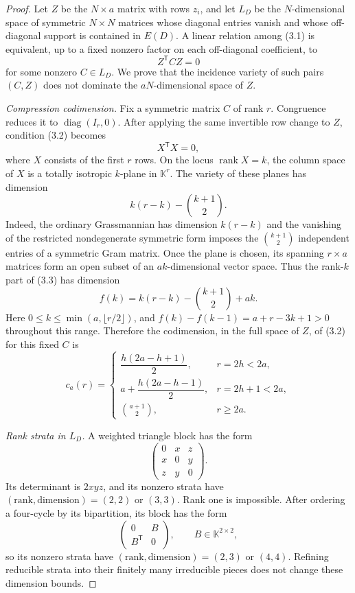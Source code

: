 \documentclass[11pt]{article}
\newcommand{\K}{\mathbb{K}}
\newcommand{\rank}{\operatorname{rank}}
\begin{document}
\begin{proof}
Let $Z$ be the $N\times a$ matrix with rows $z_i$, and let $L_D$ be the
$N$-dimensional space of symmetric $N\times N$ matrices whose diagonal
entries vanish and whose off-diagonal support is contained in $E(D)$.  A
linear relation among (3.1) is equivalent, up to a fixed nonzero factor on
each off-diagonal coefficient, to
\[
 Z^{\mathsf T}CZ=0
 \tag{3.2}
\]
for some nonzero $C\in L_D$.  We prove that the incidence variety of such
pairs $(C,Z)$ does not dominate the $aN$-dimensional space of $Z$.

\smallskip
\noindent\emph{Compression codimension.}
Fix a symmetric matrix $C$ of rank $r$.  Congruence reduces it to
$\operatorname{diag}(I_r,0)$.  After applying the same invertible row change
to $Z$, condition (3.2) becomes
\[
 X^{\mathsf T}X=0,
 \tag{3.3}
\]
where $X$ consists of the first $r$ rows.  On the locus $\rank X=k$, the
column space of $X$ is a totally isotropic $k$-plane in $\K^r$.  The variety
of these planes has dimension
\[
 k(r-k)-\binom{k+1}{2}.
\]
Indeed, the ordinary Grassmannian has dimension $k(r-k)$ and the vanishing
of the restricted nondegenerate symmetric form imposes the
$\binom{k+1}{2}$ independent entries of a symmetric Gram matrix.  Once the
plane is chosen, its spanning $r\times a$ matrices form an open subset of an
$ak$-dimensional vector space.  Thus the rank-$k$ part of (3.3) has dimension
\[
 f(k)=k(r-k)-\binom{k+1}{2}+ak.
\]
Here $0\leq k\leq\min(a,\lfloor r/2\rfloor)$, and
$f(k)-f(k-1)=a+r-3k+1>0$ throughout this range.  Therefore the codimension,
in the full space of $Z$, of (3.2) for this fixed $C$ is
\[
 c_a(r)=
 \begin{cases}
 \dfrac{h(2a-h+1)}2,&r=2h<2a,\\[5pt]
 a+\dfrac{h(2a-h-1)}2,&r=2h+1<2a,\\[5pt]
 \binom{a+1}{2},&r\geq2a.
 \end{cases}
 \tag{3.4}
\]

\smallskip
\noindent\emph{Rank strata in $L_D$.}
A weighted triangle block has the form
\[
 \begin{pmatrix}
 0&x&z\\ x&0&y\\ z&y&0
 \end{pmatrix}.
\]
Its determinant is $2xyz$, and its nonzero strata have
$(\text{rank},\text{dimension})=(2,2)$ or $(3,3)$.  Rank one is impossible.
After ordering a four-cycle by its bipartition, its block has the form
\[
 \begin{pmatrix}0&B\\B^{\mathsf T}&0\end{pmatrix},
 \qquad B\in\K^{2\times2},
\]
so its nonzero strata have $(\text{rank},\text{dimension})=(2,3)$ or
$(4,4)$.  Refining reducible strata into their finitely many irreducible
pieces does not change these dimension bounds.


\end{proof}
\end{document}
